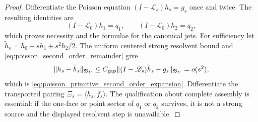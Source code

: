 \documentclass[11pt]{amsart}
\theoremstyle{compactplain}
\theoremstyle{compactdefinition}
\theoremstyle{compactremark}
\newcommand{\Ltransfer}{\mathscr L}
\begin{document}
\begin{proof}
Differentiate the Poisson equation
\((I-\Ltransfer_s)h_s=g_s\) once and twice.  The resulting identities are
\[
 (I-\Ltransfer_0)h_1=q_1,
 \qquad
 (I-\Ltransfer_0)h_2=q_2,
\]
which proves necessity and the formulae for the canonical jets.  For
sufficiency let \(\widetilde h_s=h_0+sh_1+s^2h_2/2\).  The uniform centered
strong resolvent bound and \eqref{eq:poisson_second_order_remainder} give
\[
 \|h_s-\widetilde h_s\|_{\mathfrak B_U}
 \le C_{\rm gap}
 \|(I-\Ltransfer_s)\widetilde h_s-g_s\|_{\mathfrak B_U}
 =o(s^2),
\]
which is \eqref{eq:poisson_primitive_second_order_expansion}.  Differentiate
the transported pairing \(\Xi_s=\langle h_s,f_s\rangle\).  The qualification
about complete assembly is essential: if the one-face or point sector of
\(q_1\) or \(q_2\) survives, it is not a strong source and the displayed
resolvent step is unavailable.
\end{proof}
\end{document}
